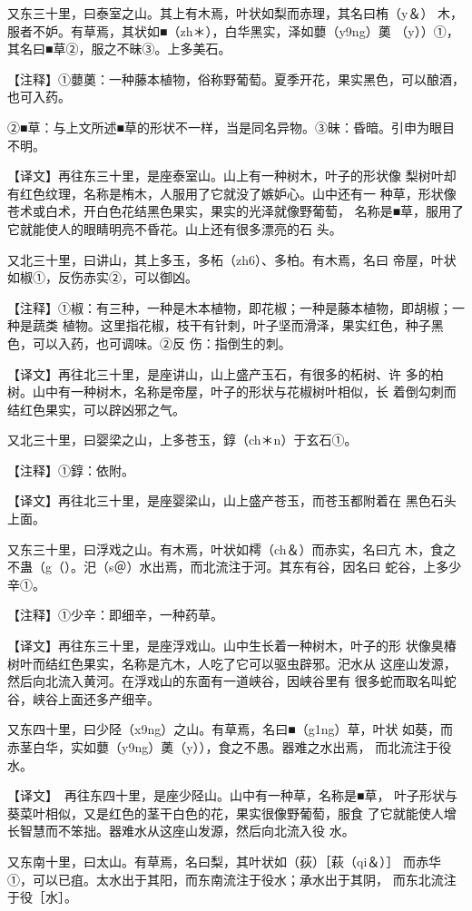 \documentclass[a4paper,12pt,UTF8,twoside]{ctexbook}
\begin{document}
又东三十里，曰泰室之山。其上有木焉，叶状如梨而赤理，其名曰栯（y＆） 木，服者不妒。有草焉，其状如■（zh＊），白华黑实，泽如蘡（y9ng）薁 （y））①，其名曰■草②，服之不昧③。上多美石。

【注释】①蘡薁：一种藤本植物，俗称野葡萄。夏季开花，果实黑色，可以酿酒，也可入药。

②■草：与上文所述■草的形状不一样，当是同名异物。③昧：昏暗。引申为眼目不明。

【译文】再往东三十里，是座泰室山。山上有一种树木，叶子的形状像 梨树叶却有红色纹理，名称是栯木，人服用了它就没了嫉妒心。山中还有一 种草，形状像苍术或白术，开白色花结黑色果实，果实的光泽就像野葡萄， 名称是■草，服用了它就能使人的眼睛明亮不昏花。山上还有很多漂亮的石 头。

又北三十里，曰讲山，其上多玉，多柘（zh6）、多柏。有木焉，名曰 帝屋，叶状如椒①，反伤赤实②，可以御凶。

【注释】①椒：有三种，一种是木本植物，即花椒；一种是藤本植物，即胡椒；一种是蔬类 植物。这里指花椒，枝干有针刺，叶子坚而滑泽，果实红色，种子黑色，可以入药，也可调味。②反 伤：指倒生的刺。

【译文】再往北三十里，是座讲山，山上盛产玉石，有很多的柘树、许 多的柏树。山中有一种树木，名称是帝屋，叶子的形状与花椒树叶相似，长 着倒勾刺而结红色果实，可以辟凶邪之气。

又北三十里，曰婴梁之山，上多苍玉，錞（ch＊n）于玄石①。

【注释】①錞：依附。

【译文】再往北三十里，是座婴梁山，山上盛产苍玉，而苍玉都附着在 黑色石头上面。

又东三十里，曰浮戏之山。有木焉，叶状如樗（ch＆）而赤实，名曰亢 木，食之不蛊（g（）。汜（s＠）水出焉，而北流注于河。其东有谷，因名曰 蛇谷，上多少辛①。

【注释】①少辛：即细辛，一种药草。

【译文】再往东三十里，是座浮戏山。山中生长着一种树木，叶子的形 状像臭椿树叶而结红色果实，名称是亢木，人吃了它可以驱虫辟邪。汜水从 这座山发源，然后向北流入黄河。在浮戏山的东面有一道峡谷，因峡谷里有 很多蛇而取名叫蛇谷，峡谷上面还多产细辛。

又东四十里，曰少陉（x9ng）之山。有草焉，名曰■（g1ng）草，叶状 如葵，而赤茎白华，实如蘡（y9ng）薁（y）），食之不愚。器难之水出焉， 而北流注于役水。

【译文】　再往东四十里，是座少陉山。山中有一种草，名称是■草， 叶子形状与葵菜叶相似，又是红色的茎干白色的花，果实很像野葡萄，服食 了它就能使人增长智慧而不笨拙。器难水从这座山发源，然后向北流入役 水。

又东南十里，曰太山。有草焉，名曰梨，其叶状如（荻）［萩（qi＆）］ 而赤华①，可以已疽。太水出于其阳，而东南流注于役水；承水出于其阴， 而东北流注于役［水］。
\end{document}
